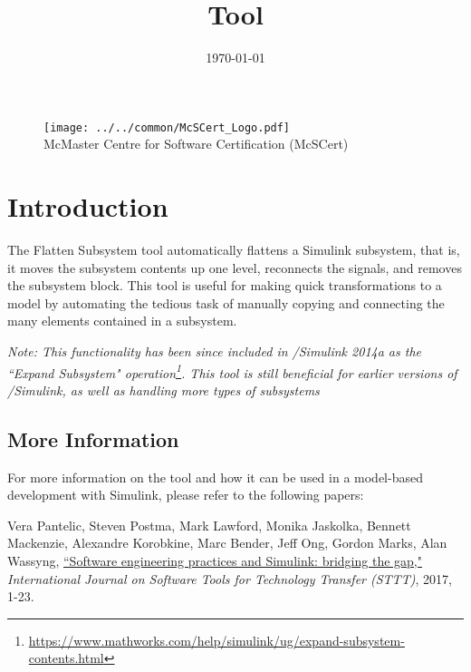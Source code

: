 \documentclass{article}
\title{\ToolName Tool}
\date{\monthyeardate\today}
\makeatletter
\newcommand{\ToolName}{Flatten Subsystem\@\xspace}
\makeatother
\begin{document}
\maketitle
\vfill

\begin{figure}
	\centering
	\texttt{[image: ../../common/McSCert\_Logo.pdf]} \\
	McMaster Centre for Software Certification (McSCert)
\end{figure}

\newpage

\section{Introduction}

The \ToolName tool automatically flattens a Simulink subsystem, that is, it moves the subsystem contents up one level, reconnects the signals, and removes the subsystem block. This tool is useful for making quick transformations to a model by automating the tedious task of manually copying and connecting the many elements contained in a subsystem.

\textit{Note: This functionality has been since included in \matlab/Simulink 2014a as the ``Expand Subsystem" operation\footnote{\url{https://www.mathworks.com/help/simulink/ug/expand-subsystem-contents.html}}. This tool is still beneficial for earlier versions of \matlab/Simulink, as well as handling more types of subsystems}

\subsection*{More Information}
For more information on the tool and how it can be used in a model-based development with Simulink, please refer to the following papers:

\vspace{1em}
Vera Pantelic, Steven Postma, Mark Lawford, Monika Jaskolka, Bennett Mackenzie, Alexandre Korobkine, Marc Bender, Jeff Ong, Gordon Marks, Alan Wassyng, \href{https://link.springer.com/article/10.1007/s10009-017-0450-9}{``Software engineering practices and Simulink: bridging the gap,"} \textit{International Journal on Software Tools for Technology Transfer (STTT)}, 2017, 1-23.
\end{document}
